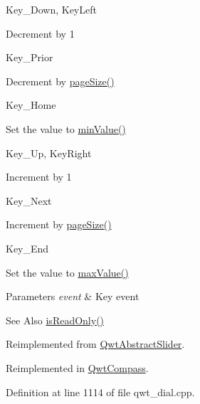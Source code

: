 \begin{DoxyItemize}
\item Key\-\_\-\-Down, Key\-Left\par
 Decrement by 1
\item Key\-\_\-\-Prior\par
 Decrement by \hyperlink{class_qwt_double_range_ac12a5c43dc5839913379982ec40a39d8}{page\-Size()}
\item Key\-\_\-\-Home\par
 Set the value to \hyperlink{class_qwt_double_range_a8b8650a6f8a96144d3af21207ee71637}{min\-Value()}
\end{DoxyItemize}


\begin{DoxyItemize}
\item Key\-\_\-\-Up, Key\-Right\par
 Increment by 1
\item Key\-\_\-\-Next\par
 Increment by \hyperlink{class_qwt_double_range_ac12a5c43dc5839913379982ec40a39d8}{page\-Size()}
\item Key\-\_\-\-End\par
 Set the value to \hyperlink{class_qwt_double_range_a215275a1a8b4218a424ee8444c7fe409}{max\-Value()}
\end{DoxyItemize}


\begin{DoxyParams}{Parameters}
{\em event} & Key event \\
\hline
\end{DoxyParams}
\begin{DoxySeeAlso}{See Also}
\hyperlink{class_qwt_abstract_slider_a040fd1fd03592c524314bf4b5539608d}{is\-Read\-Only()} 
\end{DoxySeeAlso}


Reimplemented from \hyperlink{class_qwt_abstract_slider_a4d55f8ffab93d8610bc026e00e3bdc81}{Qwt\-Abstract\-Slider}.



Reimplemented in \hyperlink{class_qwt_compass_ad4f31e6837ea045834fe67d192a4209d}{Qwt\-Compass}.



Definition at line 1114 of file qwt\-\_\-dial.\-cpp.

